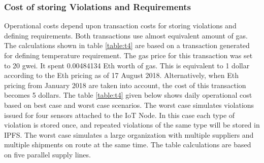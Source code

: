 \subsubsection{Cost of storing Violations and Requirements}
Operational costs depend upon transaction costs for storing violations and defining requirements. Both transactions use almost equivalent amount of gas. The calculations shown in table \ref{table:t4} are based on a transaction generated for defining temperature requirement. The gas price for this transaction was set to 20 gwei. It spent 0.00484134 Eth worth of gas. This is equivalent to 1 dollar according to the Eth pricing as of 17 August 2018. Alternatively, when Eth pricing from January 2018 are taken into account, the cost of this transaction becomes 5 dollars. The table \ref{table:t4} given below shows daily operational cost based on best case and worst case scenarios. The worst case simulates violations issued for four sensors attached to the IoT Node. In this case each type of violation is stored once, and repeated violations of the same type will be stored in IPFS. The worst case simulates a large organization with multiple suppliers and multiple shipments on route at the same time. The table calculations are based on five parallel supply lines.
